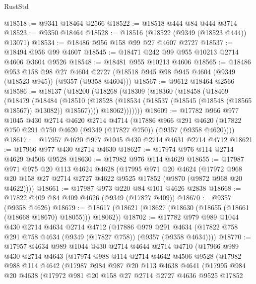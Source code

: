 \begin{lexlean}{RustStd}
\begin{coremodule}
@18518 := @9341 @18464 @2566
@18522 := @18518 @444 @84 @444 @3714
@18523 := @9350 @18464
@18528 := @18516 (@18522 (@9349 (@18523 @444)) @13071)
@18534 := @18486 @956 @158 @99 @27 @4607 @2727
@18537 := @18494 @956 @99 @4607
@18545 := @18471 @242 @99 @955 @10213 @2714 @4606 @3604 @9526
@18548 := @18481 @955 @10213 @4606
@18565 := @18486
    @953
    @158
    @98
    @27
    @4604
    @2727
    (@18518 @945 @98 @945 @4604 (@9349 (@18523 @945)) (@9357 (@9358 @4604)))
@18567 := @9612 @18464 @2566
@18586 := @18137
    (@18200
      (@18268
        (@18309
          (@18360
            (@18458
              (@18469
                (@18479
                  (@18484
                    (@18510
                      (@18528 (@18534 (@18537 (@18545 (@18548 (@18565 @18567)) @13082)) @18567))))
                  @18062)))))))
@18609 := @17782
    @966
    @977
    @1045
    @430
    @2714
    @4620
    @2714
    @4714
    (@17886
      @966
      @291
      @4620
      (@17822 @750 @291 @750 @4620 (@9349 (@17827 @750)) (@9357 (@9358 @4620))))
@18617 := @17957 @4620 @977 @1045 @430 @2714 @4631 @2714 @4712
@18621 := @17966 @977 @430 @2714 @4630
@18627 := @17974 @976 @114 @2714 @4629 @4506 @9528
@18630 := @17982 @976 @114 @4629
@18655 := @17987
    @971
    @975
    @20
    @113
    @4624
    @4628
    (@17995
      @971
      @20
      @4624
      (@17972 @968 @20 @158 @27 @2714 @2727 @4622 @9525 @17852 (@9870 (@9872 @968 @20 @4622))))
@18661 := @17987 @973 @220 @84 @101 @4626 @2838
@18668 := @17822 @409 @84 @409 @4626 (@9349 (@17827 @409))
@18670 := @9357 (@9358 @4626)
@18679 := @18617 (@18621 (@18627 (@18630 (@18655 (@18661 (@18668 @18670) @18055))) @18062))
@18702 := @17782
    @979
    @989
    @1044
    @430
    @2714
    @4634
    @2714
    @4712
    (@17886
      @979
      @291
      @4634
      (@17822 @758 @291 @758 @4634 (@9349 (@17827 @758)) (@9357 (@9358 @4634))))
@18770 := @17957
    @4634
    @989
    @1044
    @430
    @2714
    @4644
    @2714
    @4710
    (@17966
      @989
      @430
      @2714
      @4643
      (@17974
        @988
        @114
        @2714
        @4642
        @4506
        @9528
        (@17982
          @988
          @114
          @4642
          (@17987
            @984
            @987
            @20
            @113
            @4638
            @4641
            (@17995
              @984
              @20
              @4638
              (@17972
                @981
                @20
                @158
                @27
                @2714
                @2727
                @4636
                @9525
                @17852

\end{coremodule}
\end{lexlean}
